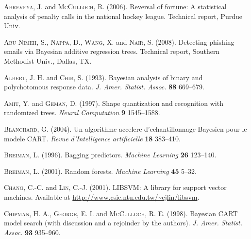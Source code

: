 \documentclass[aoas,nameyear,dvips]{arximspdf}
\begin{document}
\begin{thebibliography}{99}

\textsc{Abreveya}, J. and \textsc{McCulloch}, R.  (2006).
  Reversal of fortune: A statistical analysis of penalty calls in the national
  hockey league. Technical report, Purdue Univ.

\textsc{Abu-Nimeh}, S., \textsc{Nappa}, D., \textsc{Wang}, X. and \textsc{Nair}, S.  (2008). Detecting phishing emails via {B}ayesian additive
  regression trees. Technical report, Southern Methodist Univ., Dallas,
  TX.

\textsc{Albert}, J. H. and \textsc{Chib}, S.  (1993). Bayesian
  analysis of binary and polychotomous response data. \textit{J.
  Amer. Statist. Assoc.} \textbf{88} 669--679.

\textsc{Amit}, Y. and \textsc{Geman}, D.  (1997). Shape
  quantization and recognition with randomized trees. \textit{Neural Computation}
  \textbf{9} 1545--1588.

\textsc{Blanchard}, G.  (2004). Un algorithme accelere
  d'echantillonnage {B}ayesien pour le modele {CART}. \textit{Revue
  d'Intelligence artificielle} \textbf{18} 383--410.

\textsc{Breiman}, L.  (1996). Bagging predictors. \textit{Machine Learning} \textbf{26} 123--140.

\textsc{Breiman}, L.  (2001). Random forests. \textit{Machine
  Learning} \textbf{45} 5--32.

\textsc{Chang}, C.-C. and \textsc{Lin}, C.-J.  (2001). LIBSVM: A library for support vector machines.
Available at \url{http://www.csie.ntu.edu.tw/~cjlin/libsvm}.

\textsc{Chipman}, H. A., \textsc{George}, E. I. and \textsc{McCulloch}, R. E.  (1998).
Bayesian {CART} model search (with discussion and a rejoinder by the authors). \textit{J. Amer. Statist. Assoc.} \textbf{93} 935--960.


\end{thebibliography}
\end{document}
